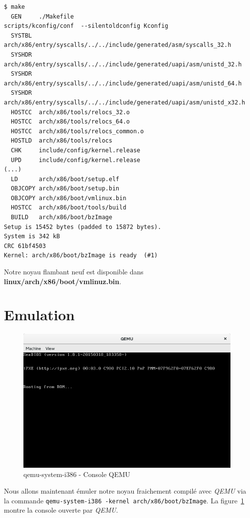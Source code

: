 \documentclass[a4paper]{article}
\begin{document}
\begin{verbatim}
$ make
  GEN     ./Makefile
scripts/kconfig/conf  --silentoldconfig Kconfig
  SYSTBL  arch/x86/entry/syscalls/../../include/generated/asm/syscalls_32.h
  SYSHDR  arch/x86/entry/syscalls/../../include/generated/uapi/asm/unistd_32.h
  SYSHDR  arch/x86/entry/syscalls/../../include/generated/uapi/asm/unistd_64.h
  SYSHDR  arch/x86/entry/syscalls/../../include/generated/uapi/asm/unistd_x32.h
  HOSTCC  arch/x86/tools/relocs_32.o
  HOSTCC  arch/x86/tools/relocs_64.o
  HOSTCC  arch/x86/tools/relocs_common.o
  HOSTLD  arch/x86/tools/relocs
  CHK     include/config/kernel.release
  UPD     include/config/kernel.release
(...)
  LD      arch/x86/boot/setup.elf
  OBJCOPY arch/x86/boot/setup.bin
  OBJCOPY arch/x86/boot/vmlinux.bin
  HOSTCC  arch/x86/boot/tools/build
  BUILD   arch/x86/boot/bzImage
Setup is 15452 bytes (padded to 15872 bytes).
System is 342 kB
CRC 61bf4503
Kernel: arch/x86/boot/bzImage is ready  (#1)
\end{verbatim}

Notre noyau flambant neuf est disponible dans \textbf{linux/arch/x86/boot/vmlinuz.bin}.

\section{Emulation}

\begin{figure}
\label{qemu_first_run}
\includegraphics[scale=0.5]{qemu-first-run.png}
\caption{qemu-system-i386 - Console QEMU}
\end{figure}

Nous allons maintenant émuler notre noyau fraichement compilé avec \textit{QEMU} via la commande \lstset{language=sh}\lstinline{qemu-system-i386 -kernel arch/x86/boot/bzImage}. La figure~\ref{qemu_first_run} montre la console ouverte par \textit{QEMU}.\\
\end{document}
